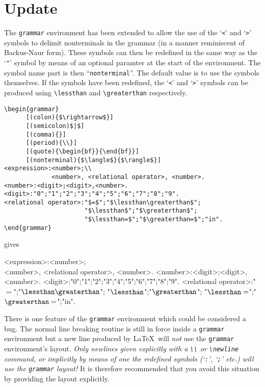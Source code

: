 \section{Update}
The {\tt grammar} environment has been extended to allow the use of the
`\verb!<!' and `\verb!>!' symbols to delimit nonterminals in the grammar
(in a manner reminiscent of Backus-Naur form). These symbols can then be
redefined in the same way as the `\verb!"!' symbol by means of an
optional paramter at the start of the environment. The {\sc symbol name}
part is then ``\verb!nonterminal!''. The default value is to use the
symbols themselves. If the symbols have been redefined, the `\verb!<!'
and `\verb!>!' symbols can be produced using \verb!\lessthan! and
\verb!\greaterthan! respectively.
\begin{verbatim}
\begin{grammar}
      [(colon){$\rightarrow$}]
      [(semicolon)$|$]
      [(comma){}]
      [(period){\\}]
      [(quote){\begin{bf}}{\end{bf}}]
      [(nonterminal){$\langle$}{$\rangle$}]
<expression>:<number>;\\
             <number>, <relational operator>, <number>.
<number>:<digit>;<digit>,<number>.
<digit>:"0";"1";"2";"3";"4";"5";"6";"7";"8";"9".
<relational operator>:"$=$";"$\lessthan\greaterthan$";
                      "$\lessthan$";"$\greaterthan$";
                      "$\lessthan=$";"$\greaterthan=$";"in".
\end{grammar}
\end{verbatim}
gives
\begin{grammar}
<expression>:<number>;\\
             <number>, <relational operator>, <number>.
<number>:<digit>;<digit>,<number>.
<digit>:"0";"1";"2";"3";"4";"5";"6";"7";"8";"9".
<relational operator>:"$=$";"$\lessthan\greaterthan$";
                      "$\lessthan$";"$\greaterthan$";
                      "$\lessthan=$";"$\greaterthan=$";"in".
\end{grammar}
There is one feature of the {\tt grammar} environment which could be
considered a bug. The normal line breaking routine is still in force
inside a {\tt grammar} environment but a new line produced by \LaTeX\
will {\em not} use the {\tt grammar} environment's layout. {\em Only
newlines given explicitly with a \verb!\\! or \verb!\newline! command,
or implicitly by means of one the redefined symbols (`\verb!:!',
`\verb!;!' etc.) will use the {\tt grammar} layout!}\/ It is therefore
recommended that you avoid this situation by providing the layout
explicitly.
